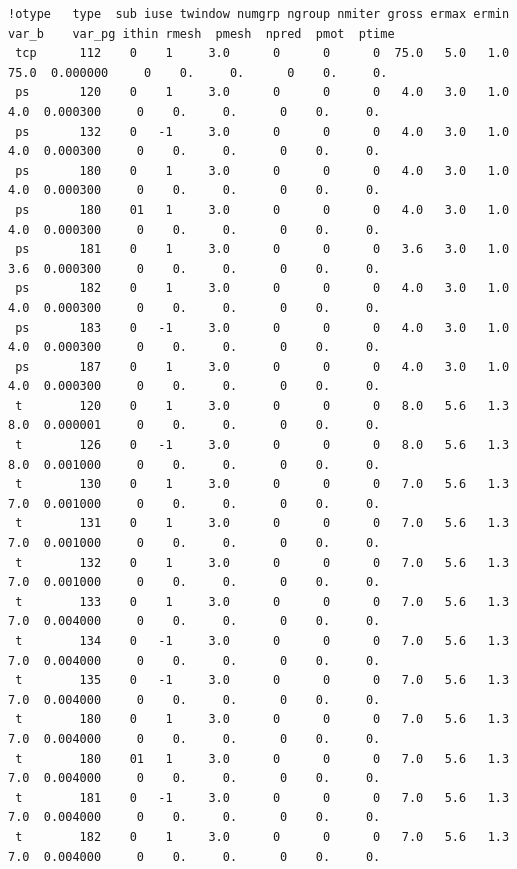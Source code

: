 \begin{enumerate}[leftmargin=*]
\begin{itemize}[leftmargin=*]
\begin{tiny}
\begin{verbatim}
!otype   type  sub iuse twindow numgrp ngroup nmiter gross ermax ermin var_b    var_pg ithin rmesh  pmesh  npred  pmot  ptime
 tcp      112    0    1     3.0      0      0      0  75.0   5.0   1.0  75.0  0.000000     0    0.     0.      0    0.     0.
 ps       120    0    1     3.0      0      0      0   4.0   3.0   1.0   4.0  0.000300     0    0.     0.      0    0.     0.
 ps       132    0   -1     3.0      0      0      0   4.0   3.0   1.0   4.0  0.000300     0    0.     0.      0    0.     0.
 ps       180    0    1     3.0      0      0      0   4.0   3.0   1.0   4.0  0.000300     0    0.     0.      0    0.     0.
 ps       180    01   1     3.0      0      0      0   4.0   3.0   1.0   4.0  0.000300     0    0.     0.      0    0.     0.
 ps       181    0    1     3.0      0      0      0   3.6   3.0   1.0   3.6  0.000300     0    0.     0.      0    0.     0.
 ps       182    0    1     3.0      0      0      0   4.0   3.0   1.0   4.0  0.000300     0    0.     0.      0    0.     0.
 ps       183    0   -1     3.0      0      0      0   4.0   3.0   1.0   4.0  0.000300     0    0.     0.      0    0.     0.
 ps       187    0    1     3.0      0      0      0   4.0   3.0   1.0   4.0  0.000300     0    0.     0.      0    0.     0.
 t        120    0    1     3.0      0      0      0   8.0   5.6   1.3   8.0  0.000001     0    0.     0.      0    0.     0.
 t        126    0   -1     3.0      0      0      0   8.0   5.6   1.3   8.0  0.001000     0    0.     0.      0    0.     0.
 t        130    0    1     3.0      0      0      0   7.0   5.6   1.3   7.0  0.001000     0    0.     0.      0    0.     0.
 t        131    0    1     3.0      0      0      0   7.0   5.6   1.3   7.0  0.001000     0    0.     0.      0    0.     0.
 t        132    0    1     3.0      0      0      0   7.0   5.6   1.3   7.0  0.001000     0    0.     0.      0    0.     0.
 t        133    0    1     3.0      0      0      0   7.0   5.6   1.3   7.0  0.004000     0    0.     0.      0    0.     0.
 t        134    0   -1     3.0      0      0      0   7.0   5.6   1.3   7.0  0.004000     0    0.     0.      0    0.     0.
 t        135    0   -1     3.0      0      0      0   7.0   5.6   1.3   7.0  0.004000     0    0.     0.      0    0.     0.
 t        180    0    1     3.0      0      0      0   7.0   5.6   1.3   7.0  0.004000     0    0.     0.      0    0.     0.
 t        180    01   1     3.0      0      0      0   7.0   5.6   1.3   7.0  0.004000     0    0.     0.      0    0.     0.
 t        181    0   -1     3.0      0      0      0   7.0   5.6   1.3   7.0  0.004000     0    0.     0.      0    0.     0.
 t        182    0    1     3.0      0      0      0   7.0   5.6   1.3   7.0  0.004000     0    0.     0.      0    0.     0.
\end{verbatim}
\end{tiny}


\end{itemize}
\end{enumerate}

